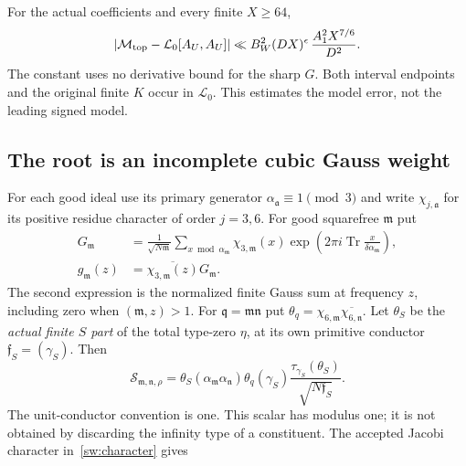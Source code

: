 \begin{proposition}
\label{gtl:model}
For the actual coefficients and every finite $X\ge64$,
\begin{equation}\label{gtl:model-error}
 |\mathcal M_{\rm top}-\mathcal L_0[A_U,A_U]|
 \ll B_W^2(DX)^\epsilon\,\frac{A_1^2X^{7/6}}{D^2}.
\end{equation}
The constant uses no derivative bound for the sharp $G$.
Both interval endpoints and the original finite $K$ occur in
$\mathcal L_0$. This estimates the model error, not the leading
signed model.
\end{proposition}

\subsection{The root is an incomplete cubic Gauss weight}
\label{gtl:root}
For each good ideal use its primary generator
$\alpha_{\mathfrak a}\equiv1\pmod3$ and write
$\chi_{j,\mathfrak a}$ for its positive residue character of order
$j=3,6$. For good squarefree $\mathfrak m$ put
\begin{equation}\label{gtl:cubic-gauss}
 \begin{aligned}
 G_{\mathfrak m}
 &=\frac1{\sqrt{N\mathfrak m}}
   \sum_{x\bmod\alpha_{\mathfrak m}}
      \chi_{3,\mathfrak m}(x)
      \exp\!\left(2\pi i\operatorname{Tr}
                   \frac{x}{\delta\alpha_{\mathfrak m}}\right),\\
 g_{\mathfrak m}(z)
 &=\overline{\chi_{3,\mathfrak m}(z)}G_{\mathfrak m}.
 \end{aligned}
\end{equation}
The second expression is the normalized finite Gauss sum at
frequency $z$, including zero when $(\mathfrak m,z)>1$.
For $\mathfrak q=\mathfrak m\mathfrak n$ put
$\theta_q=\chi_{6,\mathfrak m}\overline{\chi_{6,\mathfrak n}}$.
Let $\theta_S$ be the \emph{actual finite $S$ part} of the
total type-zero $\eta$, at its own primitive conductor
$\mathfrak f_S=(\gamma_S)$. Then
\begin{equation}\label{gtl:S-factor}
 \mathcal S_{\mathfrak m,\mathfrak n,\rho}
  =\theta_S(\alpha_{\mathfrak m}\alpha_{\mathfrak n})
       \theta_q(\gamma_S)
        \frac{\tau_{\gamma_S}(\theta_S)}{\sqrt{N\mathfrak f_S}} .
\end{equation}
The unit-conductor convention is one. This scalar has modulus one;
it is not obtained by discarding the infinity type of a constituent.
The accepted Jacobi character in~\eqref{sw:character} gives
